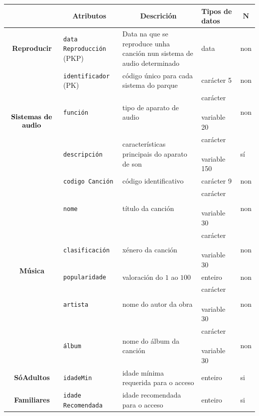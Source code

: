\documentclass[12pt,a4paper]{book}
\theoremstyle{definition}
\theoremstyle{break}
\begin{document}
	\newpage
	
	\begin{table} [H] \centering
		\begin{tabular}{|c|m{3cm}|m{4cm}|m{2cm}|m{0.7cm}|}
			\hline \rowcolor{gris}
			\multicolumn{1}{|m{2.5cm}|}{Entidade ou relación} & \multicolumn{1}{c|}{Atributos} & \multicolumn{1}{c|}{Descrición} & \multicolumn{1}{m{2cm}|}{Tipos de datos} & \multicolumn{1}{c|}{$\mathbf{N}$} \\
			\hline
			\textbf{Reproducir} & \texttt{data Reproducción} (PKP) & Data na que se reproduce unha canción nun sistema de audio determinado & data & non\\
			\hline
			\multirow{3}{*}{$\begin{array}{c}
					\text{\textbf{Sistemas de}}\\\text{\textbf{audio}}
			\end{array}$} & \texttt{identificador} (PK) & código único para cada sistema do parque & carácter 5 & non\\
			\cline{2-5}
			&\texttt{función} & tipo de aparato de audio &  carácter \textcolor{white}{aa} variable 20 & non\\
			\cline{2-5}
			& \texttt{descripción} & características principais do aparato de son &  carácter \textcolor{white}{aa} variable 150 & sí\\
			\cline{2-5}
			\hline
			\multirow{6}{*}{\textbf{Música}} & \texttt{codigo Canción} & código identificativo & carácter 9 & non\\
			\cline{2-5}
			& \texttt{nome} & título da canción &  carácter \textcolor{white}{aa} variable 30 & non\\
			\cline{2-5}
			&\texttt{clasificación} & xénero da canción &  carácter \textcolor{white}{aa} variable 30 & non\\
			\cline{2-5}
			& \texttt{popularidade} & valoración do $1$ ao $100$ & enteiro & non\\
			\cline{2-5}
			& \texttt{artista} & nome do autor da obra &  carácter \textcolor{white}{aa} variable 30 & non\\
			\cline{2-5}
			& \texttt{álbum} & nome do álbum da canción &  carácter \textcolor{white}{aa} variable 30 & non\\
			\hline
			\textbf{SóAdultos} & \texttt{idadeMin} & idade mínima requerida para o acceso & enteiro & si\\
			\hline
			\textbf{Familiares} & \texttt{idade Recomendada } & idade recomendada para o acceso & enteiro & si\\
			\hline 
			
		\end{tabular}
	\end{table}
	
\end{document}
